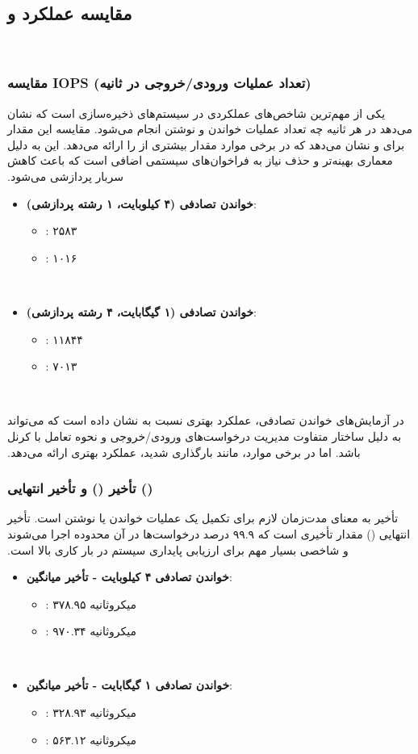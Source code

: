 ‫
‫\subsection*{مقایسه عملکرد  و }
‫
‫\subsubsection*{مقایسه IOPS (تعداد عملیات ورودی/خروجی در ثانیه)}
‫
‫ یکی از مهم‌ترین شاخص‌های عملکردی در سیستم‌های ذخیره‌سازی است که نشان می‌دهد در هر ثانیه چه تعداد عملیات خواندن و نوشتن انجام می‌شود. مقایسه این مقدار برای  و  نشان می‌دهد که  در برخی موارد مقدار بیشتری از  را ارائه می‌دهد. این به دلیل معماری بهینه‌تر  و حذف نیاز به فراخوان‌های سیستمی اضافی است که باعث کاهش سربار پردازشی می‌شود.
‫
‫\begin{itemize}
‫	\item \textbf{خواندن تصادفی (۴ کیلوبایت، ۱ رشته پردازشی)}:
‫	\begin{itemize}
‫		\item {}: ۲۵۸۳ 
‫		\item {}: ۱۰۱۶ 
‫	\end{itemize}
‫	\item \textbf{خواندن تصادفی (۱ گیگابایت، ۴ رشته پردازشی)}:
‫	\begin{itemize}
‫		\item {}: ۱۱۸۴۴ 
‫		\item {}: ۷۰۱۳ 
‫	\end{itemize}
‫\end{itemize}
‫
‫در آزمایش‌های خواندن تصادفی،  عملکرد بهتری نسبت به  نشان داده است که می‌تواند به دلیل ساختار متفاوت مدیریت درخواست‌های ورودی/خروجی و نحوه تعامل با کرنل باشد. اما در برخی موارد، مانند بارگذاری شدید،  عملکرد بهتری ارائه می‌دهد.
‫
‫\subsubsection*{تأخیر () و تأخیر انتهایی ()}
‫
‫تأخیر به معنای مدت‌زمان لازم برای تکمیل یک عملیات خواندن یا نوشتن است. تأخیر انتهایی () مقدار تأخیری است که ۹۹.۹ درصد درخواست‌ها در آن محدوده اجرا می‌شوند و شاخصی بسیار مهم برای ارزیابی پایداری سیستم در بار کاری بالا است.
‫
‫\begin{itemize}
‫	\item \textbf{خواندن تصادفی ۴ کیلوبایت - تأخیر میانگین}:
‫	\begin{itemize}
‫		\item {}: ۳۷۸.۹۵ میکروثانیه
‫		\item {}: ۹۷۰.۳۴ میکروثانیه
‫	\end{itemize}
‫	\item \textbf{خواندن تصادفی ۱ گیگابایت - تأخیر میانگین}:
‫	\begin{itemize}
‫		\item {}: ۳۲۸.۹۳ میکروثانیه
‫		\item {}: ۵۶۳.۱۲ میکروثانیه
‫	\end{itemize}
‫\end{itemize}
